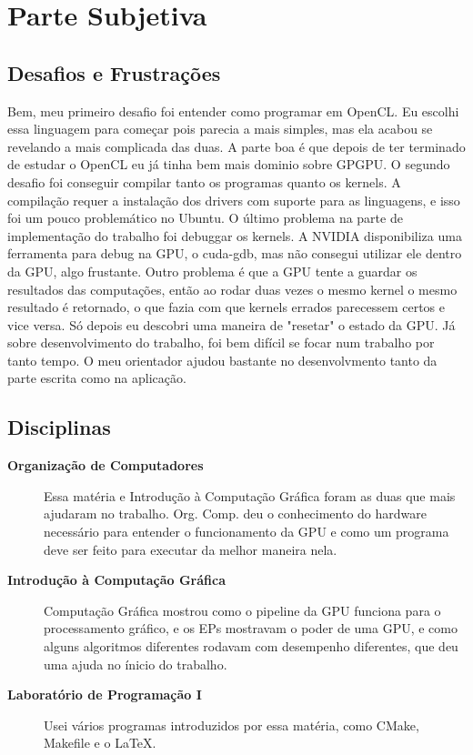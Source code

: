 \section{Parte Subjetiva}

\subsection{Desafios e Frustrações}

Bem, meu primeiro desafio foi entender como programar em OpenCL. Eu escolhi essa linguagem para começar
pois parecia a mais simples, mas ela acabou se revelando a mais complicada das duas. A parte boa é que
depois de ter terminado de estudar o OpenCL eu já tinha bem mais dominio sobre GPGPU. O segundo desafio
foi conseguir compilar tanto os programas quanto os kernels. A compilação requer a instalação dos drivers
com suporte para as linguagens, e isso foi um pouco problemático no Ubuntu. O último problema na parte de
implementação do trabalho foi debuggar os kernels. A NVIDIA disponibiliza uma ferramenta para debug na GPU,
o cuda-gdb, mas não consegui utilizar ele dentro da GPU, algo frustante. Outro problema é que a GPU tente
a guardar os resultados das computações, então ao rodar duas vezes o mesmo kernel o mesmo resultado é retornado,
o que fazia com que kernels errados parecessem certos e vice versa. Só depois eu descobri uma maneira de
"resetar" o estado da GPU. Já sobre desenvolvimento do trabalho, foi bem difícil se focar num trabalho por
tanto tempo. O meu orientador ajudou bastante no desenvolvmento tanto da parte escrita como na aplicação.

\subsection{Disciplinas}

\begin{description}
  \item[\textbf{Organização de Computadores}] Essa matéria e Introdução à Computação Gráfica foram as duas que mais ajudaram no trabalho.
      Org. Comp. deu o conhecimento do hardware necessário para entender o funcionamento da GPU e como um programa deve
      ser feito para executar da melhor maneira nela.
  \item[\textbf{Introdução à Computação Gráfica}] Computação Gráfica mostrou como o pipeline da GPU funciona para o processamento gráfico,
      e os EPs mostravam o poder de uma GPU, e como alguns algoritmos diferentes rodavam com desempenho diferentes, que deu uma ajuda
      no ínicio do trabalho.
  \item[\textbf{Laboratório de Programação I}] Usei vários programas introduzidos por essa matéria, como CMake, Makefile e o LaTeX.
\end{description}

